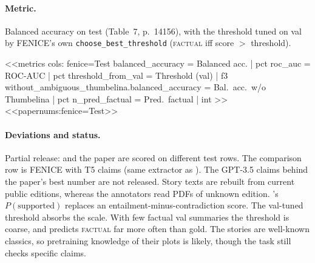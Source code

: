 \paragraph{Metric.} Balanced accuracy on test (Table~7, p.~14156), with the threshold tuned on val by FENICE's own
\texttt{choose\_best\_threshold} (\textsc{factual} iff score $>$ threshold).

<<metrics
cols: fenice=Test
balanced_accuracy = Balanced acc. | pct
roc_auc = ROC-AUC | pct
threshold_from_val = Threshold (val) | f3
without_ambiguous_thumbelina.balanced_accuracy = Bal.\ acc.\ w/o Thumbelina | pct
n_pred_factual = Pred.\ factual | int
>>
<<papernums:fenice=Test>>

\paragraph{Deviations and status.} Partial release: \jev{} and the paper are scored on different test rows. The
comparison row is FENICE with T5 claims (same extractor as \jev{}). The GPT-3.5 claims behind the paper's best
number are not released. Story texts are rebuilt from current public editions, whereas the annotators read PDFs of
unknown edition. \jev{}'s $P(\text{supported})$ replaces an entailment-minus-contradiction score. The val-tuned
threshold absorbs the scale. With few factual val summaries the threshold is coarse, and \jev{} predicts
\textsc{factual} far more often than gold. The stories are well-known classics, so pretraining knowledge of their
plots is likely, though the task still checks specific claims.
